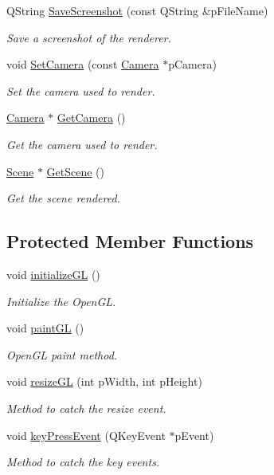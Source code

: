 \begin{DoxyCompactItemize}
Q\+String \hyperlink{class_g_l_canvas_a16125e392094d96ff68452095e9a358e}{Save\+Screenshot} (const Q\+String \&p\+File\+Name)
\begin{DoxyCompactList}\small\item\em Save a screenshot of the renderer. \end{DoxyCompactList}\item 
void \hyperlink{class_g_l_canvas_a5dc3c27442c7bbcdeeb649888f39f6ea}{Set\+Camera} (const \hyperlink{class_camera}{Camera} $\ast$p\+Camera)
\begin{DoxyCompactList}\small\item\em Set the camera used to render. \end{DoxyCompactList}\item 
\hyperlink{class_camera}{Camera} $\ast$ \hyperlink{class_g_l_canvas_a580935482356ce4b627b51180bfb1c6b}{Get\+Camera} ()
\begin{DoxyCompactList}\small\item\em Get the camera used to render. \end{DoxyCompactList}\item 
\hyperlink{class_scene}{Scene} $\ast$ \hyperlink{class_g_l_canvas_a63cd5238d1da2877877abfe946138dde}{Get\+Scene} ()
\begin{DoxyCompactList}\small\item\em Get the scene rendered. \end{DoxyCompactList}\end{DoxyCompactItemize}
\subsection*{Protected Member Functions}
\begin{DoxyCompactItemize}
\item 
void \hyperlink{class_g_l_canvas_af2d9b9abb7f03f024e91d7357e3ba02a}{initialize\+G\+L} ()
\begin{DoxyCompactList}\small\item\em Initialize the Open\+G\+L. \end{DoxyCompactList}\item 
void \hyperlink{class_g_l_canvas_a8e33d257b75968f5e0ec4e458df9407b}{paint\+G\+L} ()
\begin{DoxyCompactList}\small\item\em Open\+G\+L paint method. \end{DoxyCompactList}\item 
void \hyperlink{class_g_l_canvas_aa329a08cd23838dd8c077b359ca537b2}{resize\+G\+L} (int p\+Width, int p\+Height)
\begin{DoxyCompactList}\small\item\em Method to catch the resize event. \end{DoxyCompactList}\item 
void \hyperlink{class_g_l_canvas_af5033d668a7e0ba6cce270351c1ed1f6}{key\+Press\+Event} (Q\+Key\+Event $\ast$p\+Event)
\begin{DoxyCompactList}\small\item\em Method to catch the key events. \end{DoxyCompactList}\end{DoxyCompactItemize}
